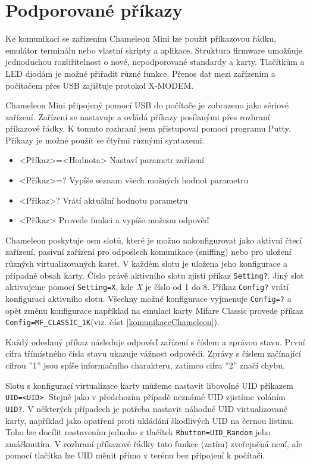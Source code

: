 \section{Podporované příkazy}
Ke komunikaci se zařízením Chameleon Mini lze použít příkazovou řádku, emulátor terminálu nebo vlastní skripty a aplikace. Struktura firmware umožňuje jednoduchou rozšiřitelnost o nové, nepodporované standardy a karty. Tlačítkům a LED diodám je možné přiřadit různé funkce. Přenos dat mezi zařízením a počítačem přes USB zajišťuje protokol {X-MODEM}. \cite{ChameleonKickStarter}
\par
Chameleon Mini připojený pomocí USB do počítače je zobrazeno jako sériové zařízení. Zařízení se nastavuje a ovládá příkazy posílanými přes rozhraní příkazové řádky. K tomuto rozhraní jsem přistupoval pomocí programu Putty. Příkazy je možné použít se čtyřmi různými syntaxemi.
\begin{itemize}
  \item <Příkaz>=<Hodnota> Nastaví parametr zařízení
  \item <Příkaz>=? Vypíše seznam všech možných hodnot parametru
  \item <Příkaz>? Vrátí aktuální hodnotu parametru
  \item <Příkaz> Provede funkci a vypíše možnou odpověď
\end{itemize}
Chameleon poskytuje osm slotů, které je možno nakonfigurovat jako aktivní čtecí zařízení, pasivní zařízení pro odposlech komunikace (sniffing) nebo pro uložení různých virtualizovaných karet. V každém slotu je uložena jeho konfigurace a případně obsah karty. Číslo právě aktivního slotu zjistí příkaz \verb|Setting?|. Jiný slot aktivujeme pomocí \verb|Setting=X|, kde \emph{X} je číslo od 1 do 8. Příkaz \verb|Config?| vrátí konfiguraci aktivního slotu. Všechny možné konfigurace vyjmenuje \verb|Config=?| a opět změnu konfigurace například na emulaci karty Mifare Classic provede příkaz \verb|Config=MF_CLASSIC_1K|(viz. část \ref{komunikaceChameleon}). \par 
Každý odeslaný příkaz následuje odpověď zařízení s číslem a zprávou stavu. První cifra třímístného čísla stavu ukazuje vážnost odpovědi. Zprávy s číslem začínající cifrou ''1'' jsou spíše informačního charakteru, zatímco cifra ''2'' značí chybu.\cite{ChameleonDocs}

Slotu s konfigurací virtualizace karty můžeme nastavit libovolné UID příkazem \verb|UID=<UID>|. Stejně jako v předchozím případě neznámé UID zjistíme voláním \verb|UID?|. V některých případech je potřeba nastavit náhodné UID virtualizované karty, například jako opatření proti ukládání škodlivých UID na černou listinu. Toho lze docílit nastavením jednoho z tlačítek \verb|Rbutton=UID_Random| jeho zmáčknutím. V rozhraní příkazové řádky tato funkce (zatím) zveřejněná není, ale pomocí tlačítka lze UID měnit přímo v terénu bez připojení k počítači.\par

